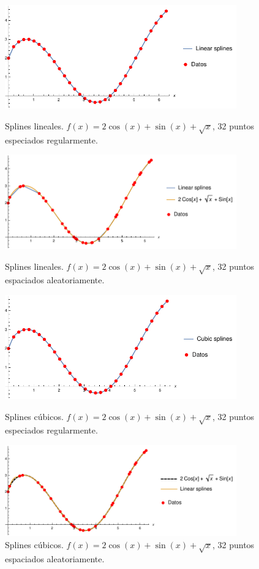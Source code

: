 \documentclass[11pt,letterpaper]{article}
\begin{document}
\begin{figure}
\centering
\includegraphics[width=10cm]{img/17.pdf}
\caption{Splines lineales. $f(x)=2\cos (x)+\sin (x)+\sqrt{x}$, 32 puntos especiados regularmente.}
\includegraphics[width=10cm]{img/18.pdf}
\caption{Splines lineales. $f(x)=2\cos (x)+\sin (x)+\sqrt{x}$, 32 puntos espaciados aleatoriamente.}
\includegraphics[width=10cm]{img/19.pdf}
\caption{Splines cúbicos. $f(x)=2\cos (x)+\sin (x)+\sqrt{x}$, 32 puntos especiados regularmente.}
\includegraphics[width=10cm]{img/20.pdf}
\caption{Splines cúbicos. $f(x)=2\cos (x)+\sin (x)+\sqrt{x}$, 32 puntos espaciados aleatoriamente.}
\end{figure}
\end{document}
